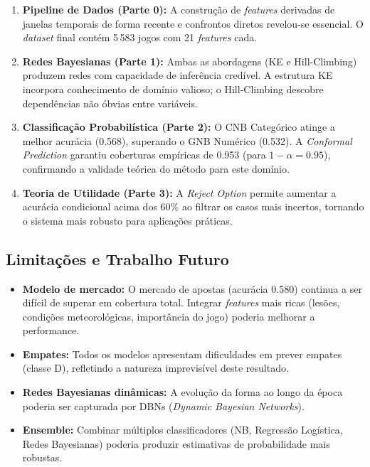 \documentclass[12pt, a4paper]{article}
\begin{document}
\begin{enumerate}
  \item \textbf{Pipeline de Dados (Parte 0):} A construção de \textit{features} derivadas de janelas temporais de forma recente e confrontos diretos revelou-se essencial. O \textit{dataset} final contém 5\,583 jogos com 21 \textit{features} cada.

  \item \textbf{Redes Bayesianas (Parte 1):} Ambas as abordagens (KE e Hill-Climbing) produzem redes com capacidade de inferência credível. A estrutura KE incorpora conhecimento de domínio valioso; o Hill-Climbing descobre dependências não óbvias entre variáveis.

  \item \textbf{Classificação Probabilística (Parte 2):} O CNB Categórico atinge a melhor acurácia (0.568), superando o GNB Numérico (0.532). A \textit{Conformal Prediction} garantiu coberturas empíricas de 0.953 (para $1-\alpha=0.95$), confirmando a validade teórica do método para este domínio.

  \item \textbf{Teoria de Utilidade (Parte 3):} A \textit{Reject Option} permite aumentar a acurácia condicional acima dos 60\% ao filtrar os casos mais incertos, tornando o sistema mais robusto para aplicações práticas.
\end{enumerate}

\subsection{Limitações e Trabalho Futuro}

\begin{itemize}
  \item \textbf{Modelo de mercado:} O mercado de apostas (acurácia 0.580) continua a ser difícil de superar em cobertura total. Integrar \textit{features} mais ricas (lesões, condições meteorológicas, importância do jogo) poderia melhorar a performance.
  \item \textbf{Empates:} Todos os modelos apresentam dificuldades em prever empates (classe D), refletindo a natureza imprevisível deste resultado.
  \item \textbf{Redes Bayesianas dinâmicas:} A evolução da forma ao longo da época poderia ser capturada por DBNs (\textit{Dynamic Bayesian Networks}).
  \item \textbf{Ensemble:} Combinar múltiplos classificadores (NB, Regressão Logística, Redes Bayesianas) poderia produzir estimativas de probabilidade mais robustas.
\end{itemize}
\end{document}

